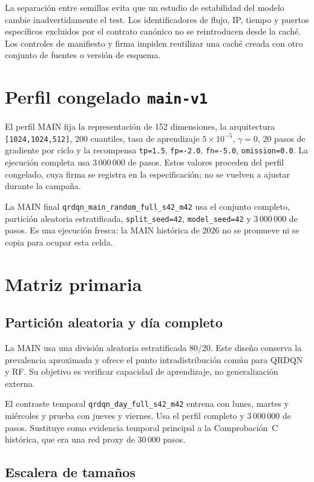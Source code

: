 La separación entre semillas evita que un estudio de estabilidad del modelo cambie inadvertidamente el test. Los identificadores de flujo, IP, tiempo y puertos específicos excluidos por el contrato canónico no se reintroducen desde la caché. Los controles de manifiesto y firma impiden reutilizar una caché creada con otro conjunto de fuentes o versión de esquema.

\section{Perfil congelado \texttt{main-v1}}

El perfil MAIN fija la representación de 152 dimensiones, la arquitectura \texttt{[1024,1024,512]}, 200 cuantiles, tasa de aprendizaje $5\times10^{-5}$, $\gamma=0$, 20 pasos de gradiente por ciclo y la recompensa \texttt{tp=1.5}, \texttt{fp=-2.0}, \texttt{fn=-5.0}, \texttt{omission=0.0}. La ejecución completa usa $3\,000\,000$ de pasos. Estos valores proceden del perfil congelado, cuya firma se registra en la especificación; no se vuelven a ajustar durante la campaña.

La MAIN final \texttt{qrdqn\_main\_random\_full\_s42\_m42} usa el conjunto completo, partición aleatoria estratificada, \texttt{split\_seed=42}, \texttt{model\_seed=42} y $3\,000\,000$ de pasos. Es una ejecución fresca: la MAIN histórica de 2026 no se promueve ni se copia para ocupar esta celda.

\section{Matriz primaria}

\subsection{Partición aleatoria y día completo}

La MAIN usa una división aleatoria estratificada 80/20. Este diseño conserva la prevalencia aproximada y ofrece el punto intradistribución común para QRDQN y RF. Su objetivo es verificar capacidad de aprendizaje, no generalización externa.

El contraste temporal \texttt{qrdqn\_day\_full\_s42\_m42} entrena con lunes, martes y miércoles y prueba con jueves y viernes. Usa el perfil completo y $3\,000\,000$ de pasos. Sustituye como evidencia temporal principal a la Comprobación~C histórica, que era una red proxy de $30\,000$ pasos.

\subsection{Escalera de tamaños}

